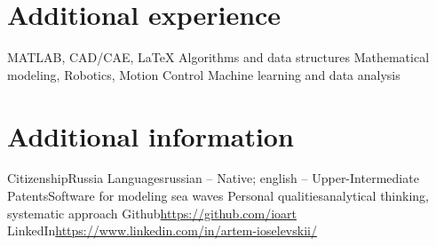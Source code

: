 \documentclass[11pt,a4paper]{moderncv}
\begin{document}
\section{Additional experience}
\cvline
    {}
    {MATLAB, CAD/CAE, \LaTeX}
\cvline
    {}
    {Algorithms and data structures}
\cvline
    {}
    {Mathematical modeling, Robotics, Motion Control}
\cvline
    {}
    {Machine learning and data analysis}

\section{Additional information}
\cvline
    {Citizenship}{Russia}
\cvline
    {Languages}{russian -- Native; english -- Upper-Intermediate}
\cvline
    {Patents}{Software for modeling sea waves}
\cvline
    {Personal qualities}{analytical thinking, systematic approach}
\cvline
    {Github}{\href{https://github.com/ioart}
                  {https://github.com/ioart}}
\cvline
    {LinkedIn}{\href{https://www.linkedin.com/in/artem-ioselevskii/}
                    {https://www.linkedin.com/in/artem-ioselevskii/}}
\end{document}
